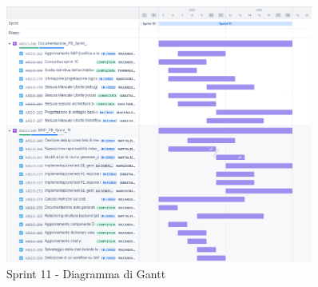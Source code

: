 \begin{figure}[H]
  \centering
  \includegraphics[width=0.90\textwidth]{assets/Pianificazione/Sprint-11/gantt.png}
  \caption{Sprint 11 - Diagramma di Gantt}\label{fig:sprint-11-gantt}
\end{figure}

